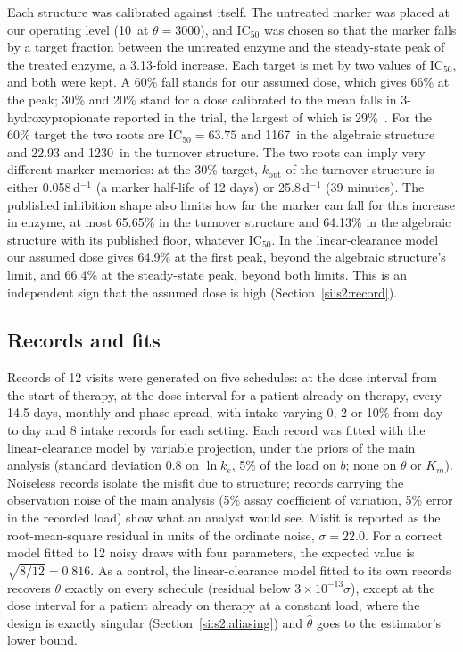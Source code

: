 Each structure was calibrated against itself. The untreated marker was placed at our operating
level (10\uM\ at $\theta=3000$\um), and $\mathrm{IC}_{50}$ was chosen so that the marker falls by a
target fraction between the untreated enzyme and the steady-state peak of the treated enzyme, a
3.13-fold increase. Each target is met by two values of $\mathrm{IC}_{50}$, and both were kept. A
60\% fall stands for our assumed dose, which gives 66\% at the peak; 30\% and 20\% stand for a dose
calibrated to the mean falls in 3-hydroxypropionate reported in the trial, the largest of which is
29\%~\cite{trial_phase12}. For the 60\% target the two roots are $\mathrm{IC}_{50}=63.75$ and
1167\um\ in the algebraic structure and 22.93 and 1230\um\ in the turnover structure. The two roots
can imply very different marker memories: at the 30\% target, $k_{\mathrm{out}}$ of the turnover
structure is either 0.058\,d$^{-1}$ (a marker half-life of 12 days) or 25.8\,d$^{-1}$ (39 minutes).
The published inhibition shape also limits how far the marker can fall for this increase in
enzyme, at most 65.65\% in the turnover structure and 64.13\% in the algebraic structure with its
published floor, whatever $\mathrm{IC}_{50}$. In the linear-clearance model our assumed dose
gives 64.9\% at the first peak, beyond the algebraic structure's limit, and 66.4\% at the
steady-state peak, beyond both limits. This is an independent sign that the assumed dose is high
(Section~\ref{si:s2:record}).

\subsection{Records and fits}
\label{si:s3:fits}

Records of 12 visits were generated on five schedules: at the dose interval from the start of
therapy, at the dose interval for a patient already on therapy, every 14.5 days, monthly and
phase-spread, with intake varying 0, 2 or 10\% from day to day and 8 intake records for each
setting. Each record was fitted with the linear-clearance model by variable projection, under the
priors of the main analysis (standard deviation 0.8 on $\ln k_e$, 5\% of the load on $b$; none on
$\theta$ or $K_m$). Noiseless records isolate the misfit due to structure; records carrying the
observation noise of the main analysis (5\% assay coefficient of variation, 5\% error in the
recorded load) show what an analyst would see. Misfit is reported as the root-mean-square residual in
units of the ordinate noise, $\sigma=22.0$\um. For a correct model fitted to 12 noisy draws with four
parameters, the expected value is $\sqrt{8/12}=0.816$. As a control, the linear-clearance model
fitted to its own records recovers $\theta$ exactly on every schedule (residual below $3\times10^{-13}\sigma$), except
at the dose interval for a patient already on therapy at a constant load, where the design is
exactly singular (Section~\ref{si:s2:aliasing}) and $\hat\theta$ goes to the estimator's lower
bound.

